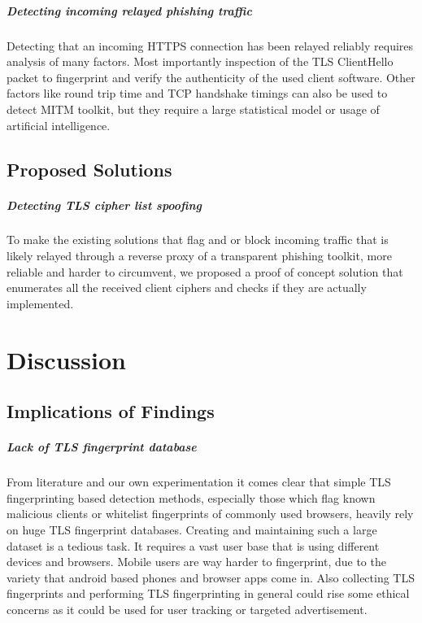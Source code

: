 \documentclass[12pt]{scrbook}
\begin{document}
\paragraph{Detecting incoming relayed phishing traffic}
Detecting that an incoming HTTPS connection has been relayed reliably requires
analysis of many factors. Most importantly inspection of the TLS ClientHello packet
to fingerprint and verify the authenticity of the used client software.
Other factors like round trip time and TCP handshake timings can also be used to
detect MITM toolkit, but they require a large statistical model or usage of artificial intelligence.

\section{Proposed Solutions}
\paragraph{Detecting TLS cipher list spoofing}
To make the existing solutions that flag and or block incoming traffic that is likely
relayed through a reverse proxy of a transparent phishing toolkit, more reliable and harder
to circumvent, we proposed a proof of concept solution that enumerates all the received
client ciphers and checks if they are actually implemented.

\chapter{Discussion}
\section{Implications of Findings}

\paragraph{Lack of TLS fingerprint database}
From literature and our own experimentation it comes clear that simple TLS fingerprinting
based detection methods, especially those which flag known malicious clients or whitelist
fingerprints of commonly used browsers, heavily rely on huge TLS fingerprint databases.
Creating and maintaining such a large dataset is a tedious task. It requires a vast user base
that is using different devices and browsers. Mobile users are way harder to fingerprint, due to the
variety that android based phones and browser apps come in. Also collecting TLS fingerprints and
performing TLS fingerprinting in general could rise some ethical concerns as it could be used
for user tracking or targeted advertisement.
\end{document}
